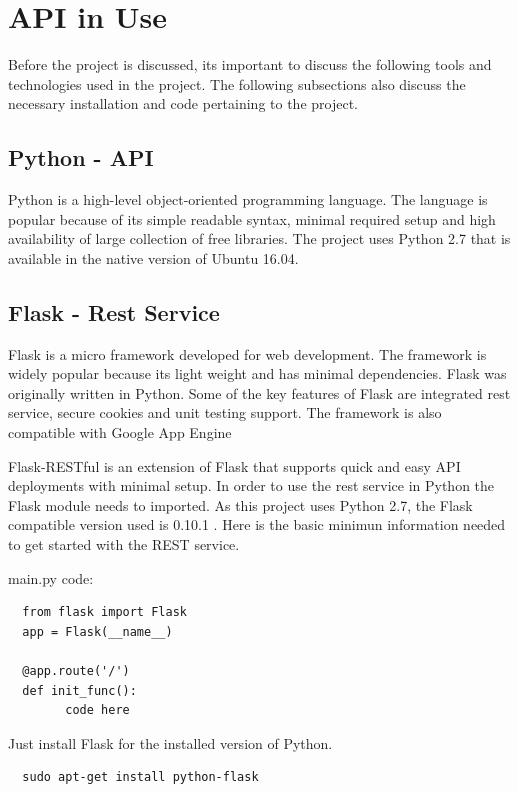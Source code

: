  
\section{API in Use}

Before the project is discussed, its important to discuss the following tools
and technologies used in the project. The following subsections also discuss
the necessary installation and code pertaining to the project.


\subsection{Python - API}
Python is a high-level object-oriented programming language. The language is
popular because of its simple readable syntax, minimal required setup and high
availability of large collection of free libraries. The project uses Python
2.7 that is available in the native version of Ubuntu 16.04.

\subsection{Flask - Rest Service}
Flask is a micro framework developed for web development. The framework is
widely popular because its light weight and has minimal dependencies. Flask
was originally written in Python. Some of the key features of Flask are
integrated rest service, secure cookies and unit testing support. The
framework is also compatible with Google App
Engine~\cite{hid-sp18-417-google_appengine}

Flask-RESTful is an extension of Flask that supports quick and easy API
deployments with minimal setup. In order to use the rest service in Python the
Flask module needs to imported. As this project uses Python 2.7, the Flask
compatible version used is 0.10.1 . Here is the basic minimun information
needed to get started with the REST service.

main.py code:

\begin{verbatim}
  from flask import Flask
  app = Flask(__name__)

  @app.route('/')
  def init_func():
        code here
\end{verbatim}

Just install Flask for the installed version of Python.

\begin{verbatim}
  sudo apt-get install python-flask
\end{verbatim}

